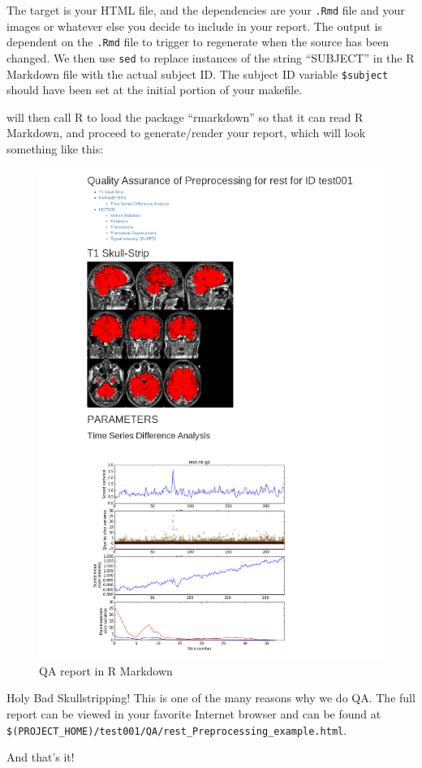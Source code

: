 The target is your HTML file, and the dependencies are your \texttt{.Rmd} file and your images or whatever else you decide to include in your report. The output is dependent on the \texttt{.Rmd} file to trigger to regenerate when the source has been changed. We then use \texttt{sed} to replace instances of the string ``SUBJECT'' in the R Markdown file with the actual subject ID. The subject ID variable \texttt{\$subject} should have been set at the initial portion of your makefile. 

\maken{} will then call R to load the package ``rmarkdown'' so that it can read R Markdown, and proceed to generate/render your report, which will look something like this: 

\begin{figure}
	\begin{center}
		\includegraphics[scale=.6]{QAcropped.png}
		\caption{QA report in R Markdown}
	\end{center}
\end{figure}

Holy Bad Skullstripping! This is one of the many reasons why we do QA. The full report can be viewed in your favorite Internet browser and can be found at \texttt{\$(PROJECT\_HOME)/test001/QA/rest\_Preprocessing\_example.html}. 
 
And that's it! 





